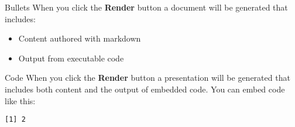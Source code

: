 \documentclass[
  ignorenonframetext,
]{beamer}
\providecommand{\tightlist}{%
  \setlength{\itemsep}{0pt}\setlength{\parskip}{0pt}}\usepackage{longtable,booktabs,array}
\begin{document}
\begin{frame}{Bullets}
\protect\hypertarget{bullets}{}
When you click the \textbf{Render} button a document will be generated
that includes:

\begin{itemize}[<+->]
\tightlist
\item
  Content authored with markdown
\item
  Output from executable code
\end{itemize}
\end{frame}

\begin{frame}[fragile]{Code}
\protect\hypertarget{code}{}
When you click the \textbf{Render} button a presentation will be
generated that includes both content and the output of embedded code.
You can embed code like this:

\begin{verbatim}
[1] 2
\end{verbatim}
\end{frame}
\end{document}
